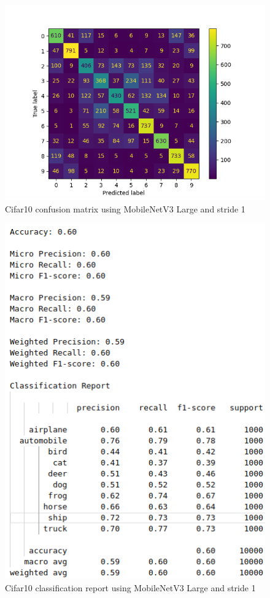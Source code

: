 \documentclass[12pt, letterpaper, twoside]{article}
\begin{document}
\begin{figure}[H]
	\centering
	\includegraphics[width=.8\textwidth]{cm_cifar10_large_s1.png}
	\caption{Cifar10 confusion matrix using MobileNetV3 Large and stride 1}
	\label{fig:cifar10_large_stride1_cm}
\end{figure}

\begin{figure}[H]
	\centering
	\includegraphics[width=.6\textwidth]{report_cifar10_large_stride1.png}
	\caption{Cifar10 classification report using MobileNetV3 Large and stride 1}
	\label{fig:cifar10_large_stride1_report}
\end{figure}



\clearpage

\nocite{*}
\printbibliography[heading=bibintoc,title={References}]
\end{document}
